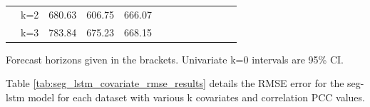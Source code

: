 \documentclass[letterpaper]{article}
\begin{document}
\begin{table}[tbp]
\begin{threeparttable}
\begin{small}
\begin{tabular}{c|c|ccccccccccc}
    & k=2 & 680.63 & 606.75 & 666.07 \\ 
    & k=3 & 783.84 & 675.23 & 668.15 \\
    \bottomrule
  \end{tabular}
  \begin{tablenotes}
    \item Forecast horizons given in the brackets. Univariate k=0 intervals are 95\% CI.
  \end{tablenotes}
  \end{small}
  \end{threeparttable}
  \label{tab:base_lstm_covariate_rmse_results}
  \vspace{-15pt}
\end{table}


Table \ref{tab:seg_lstm_covariate_rmse_results} details
the RMSE error for the seg-lstm model for each dataset with various k covariates and correlation PCC values.  
\end{document}
